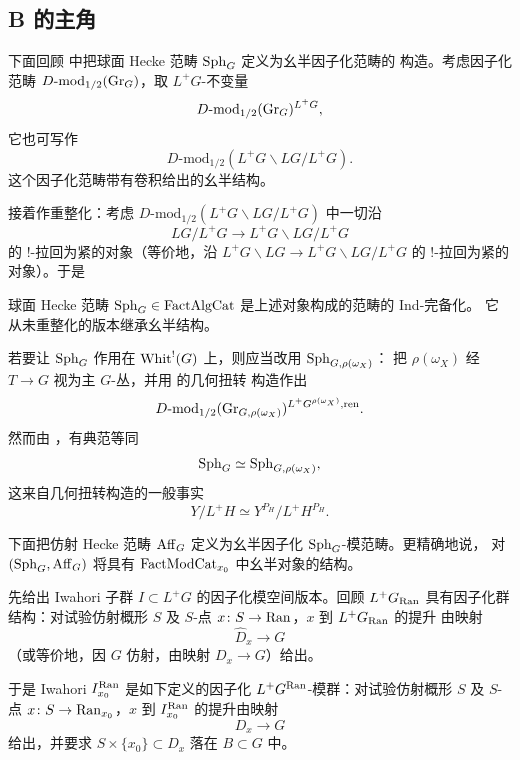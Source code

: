 
\subsection{B 的主角}
\label{sec:b-characters}

下面回顾 \cite[1.5 节]{ABC+24a} 中把球面 Hecke 范畴 $\mathrm{Sph}_G$ 定义为幺半因子化范畴的
构造。考虑因子化范畴 $D\text{-}\mathrm{mod}_{1/2}(\mathrm{Gr}_G)$，取 $L^+G$-不变量
\[
D\text{-}\mathrm{mod}_{1/2}(\mathrm{Gr}_G)^{L^+G},
\]
它也可写作
\[
D\text{-}\mathrm{mod}_{1/2}(L^+G\backslash LG/L^+G).
\]
这个因子化范畴带有卷积给出的幺半结构。

接着作重整化：考虑 $D\text{-}\mathrm{mod}_{1/2}(L^+G\backslash LG/L^+G)$ 中一切沿
\[
LG/L^+G\to L^+G\backslash LG/L^+G
\]
的 $!$-拉回为紧的对象（等价地，沿 $L^+G\backslash LG\to L^+G\backslash LG/L^+G$ 的
$!$-拉回为紧的对象）。于是

\begin{definition}
\label{def:sph}
球面 Hecke 范畴 $\mathrm{Sph}_G\in \mathrm{FactAlgCat}$ 是上述对象构成的范畴的 Ind-完备化。
它从未重整化的版本继承幺半结构。
\end{definition}

\begin{remark}
\label{rem:sph-twist}
若要让 $\mathrm{Sph}_G$ 作用在 $\mathrm{Whit}^{!}(G)$ 上，则应当改用 $\mathrm{Sph}_{G,\rho(\omega_X)}$：
把 $\rho(\omega_X)$ 经 $T\to G$ 视为主 $G$-丛，并用 \cite[1.2 节]{ABC+24a} 的几何扭转
构造作出
\[
D\text{-}\mathrm{mod}_{1/2}(\mathrm{Gr}_{G,\rho(\omega_X)})^{L^+G^{\rho(\omega_X)},\mathrm{ren}}.
\]
然而由 \cite[1.5.8 节]{ABC+24a}，有典范等同
\[
\mathrm{Sph}_G\simeq \mathrm{Sph}_{G,\rho(\omega_X)},
\]
这来自几何扭转构造的一般事实
\[
Y/L^+H\simeq Y^{P_H}/L^+H^{P_H}.
\]
\end{remark}

下面把仿射 Hecke 范畴 $\mathrm{Aff}_G$ 定义为幺半因子化 $\mathrm{Sph}_G$-模范畴。更精确地说，
对 $(\mathrm{Sph}_G,\mathrm{Aff}_G)$ 将具有 $\mathrm{FactModCat}_{x_0}$ 中幺半对象的结构。

先给出 Iwahori 子群 $I\subset L^+G$ 的因子化模空间版本。回顾 $L^+G_{\mathrm{Ran}}$ 具有因子化群
结构：对试验仿射概形 $S$ 及 $S$-点 $x\colon S\to \mathrm{Ran}$，$x$ 到 $L^+G_{\mathrm{Ran}}$ 的提升
由映射
\[
\widehat{D}_x\to G
\]
（或等价地，因 $G$ 仿射，由映射 $D_x\to G$）给出。

于是 Iwahori $I^{\mathrm{Ran}}_{x_0}$ 是如下定义的因子化 $L^+G^{\mathrm{Ran}}$-模群：对试验仿射概形
$S$ 及 $S$-点 $x\colon S\to \mathrm{Ran}_{x_0}$，$x$ 到 $I^{\mathrm{Ran}}_{x_0}$ 的提升由映射
\[
D_x\to G
\]
给出，并要求 $S\times\{x_0\}\subset D_x$ 落在 $B\subset G$ 中。

